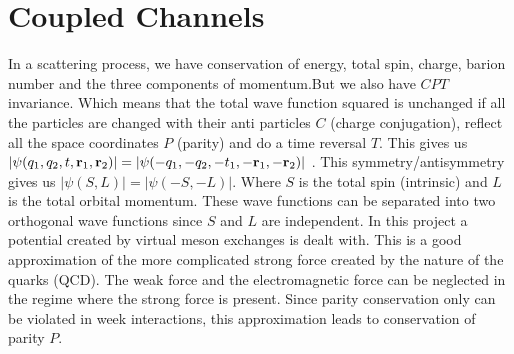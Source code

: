 














\section{Coupled Channels} 

In a scattering process, we have conservation of energy, total spin, charge, barion number and
the three components of momentum.\nl But we also have $CPT$ invariance. Which means 
that the total wave function squared is unchanged if
all the particles are changed with their anti particles $C$ (charge conjugation), reflect all
the space coordinates $P$ (parity) and do a time reversal $T$. This
gives us $|\psi(q_1,q_2,t,{\bf r}_1,{\bf r}_2)|=|\psi(-q_1,-q_2,-t_1,-{\bf r}_1,-{\bf r}_2)|$ .
This symmetry/antisymmetry gives us
$|\psi({ S},{L})|=|\psi(-{ S},-{L})|$. Where $S$ is the total spin (intrinsic) and $L$ is the total orbital momentum. 
These wave functions can be separated
into two orthogonal  wave functions since $S$ and $L$ are independent.
\nl
In this project a potential created by virtual meson exchanges is dealt with.
This is a good approximation of the more complicated strong force
created by the nature of the quarks (QCD). The weak force and the electromagnetic force can be neglected in the regime
where the strong force is present. Since parity conservation only can be violated in week interactions,
this approximation leads to conservation of parity $P$.

